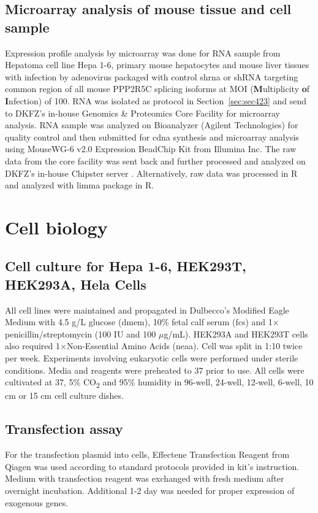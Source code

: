 \subsection{Microarray analysis of mouse tissue and cell sample}
Expression profile analysis by microarray was done for RNA sample from Hepatoma cell line Hepa 1-6, primary mouse hepatocytes and mouse liver tissues with infection by adenovirus packaged with control \gls{shrna} or shRNA targeting common region of all mouse PPP2R5C splicing isoforms at MOI (\textbf{M}ultiplicity \textbf{o}f \textbf{I}nfection) of 100. RNA was isolated as protocol in Section~\ref{sec:sec423} and send to DKFZ's in-house Genomics \& Proteomics Core Facility for microarray analysis. RNA sample was analyzed on Bioanalyzer (Agilent Technologies) for quality control and then submitted for \gls{cdna} synthesis and microarray analysis using MouseWG-6 v2.0 Expression BeadChip Kit from Illumina Inc. The raw data from the core facility was sent back and further processed and analyzed on DKFZ's in-house Chipster server  \cite{kallio_chipster:_2011}. Alternatively, raw data was processed in R and analyzed with limma package in R. 

\section{Cell biology}

\subsection{Cell culture for Hepa 1-6, HEK293T, HEK293A, Hela Cells}
All cell lines were maintained and propagated in Dulbecco's Modified Eagle Medium with 4.5 g/L glucose (\gls{dmem}), 10\% fetal calf serum (\gls{fcs}) and 1$\times$penicillin/streptomycin (100 IU and 100 $\mu$g/mL). HEK293A and HEK293T cells also required 1$\times$Non-Essential Amino Acids (\gls{neaa}). Cell was split in 1:10 twice per week. Experiments involving eukaryotic cells were performed under sterile conditions. Media and reagents were preheated to 37{\celsius} prior to use. All cells were cultivated at 37{\celsius}, 5\% CO\textsubscript{2} and 95\% humidity in 96-well, 24-well, 12-well, 6-well, 10 cm or 15 cm cell culture dishes.

\subsection{Transfection assay}
For the transfection plasmid into cells, Effectene\textsuperscript{\textregistered} Transfection Reagent from Qiagen was used according to standard protocols provided in kit's instruction. Medium with transfection reagent was exchanged with fresh medium after overnight incubation. Additional 1-2 day was needed for proper expression of exogenous genes.

